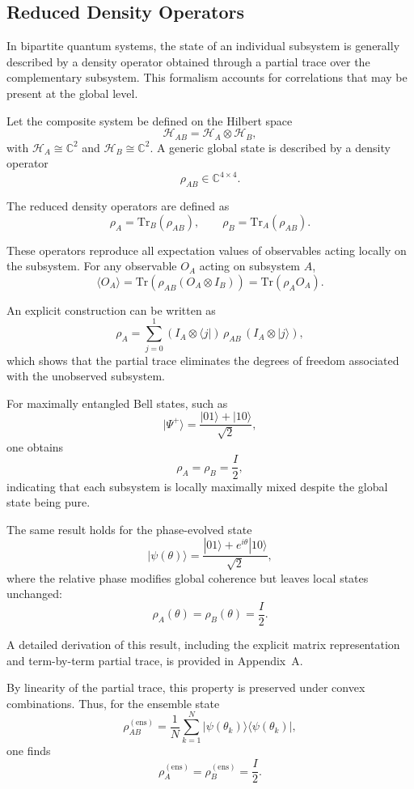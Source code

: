 \documentclass[a4paper]{article}
\begin{document}
\subsection{Reduced Density Operators}

In bipartite quantum systems, the state of an individual subsystem is generally described by a density operator obtained through a partial trace over the complementary subsystem. This formalism accounts for correlations that may be present at the global level.

Let the composite system be defined on the Hilbert space
\[
\mathcal{H}_{AB} = \mathcal{H}_A \otimes \mathcal{H}_B,
\]
with $\mathcal{H}_A \cong \mathbb{C}^2$ and $\mathcal{H}_B \cong \mathbb{C}^2$. A generic global state is described by a density operator
\[
\rho_{AB} \in \mathbb{C}^{4 \times 4}.
\]

The reduced density operators are defined as
\[
\rho_A = \mathrm{Tr}_B(\rho_{AB}), \qquad
\rho_B = \mathrm{Tr}_A(\rho_{AB}).
\]

These operators reproduce all expectation values of observables acting locally on the subsystem. For any observable $O_A$ acting on subsystem $A$,
\[
\langle O_A \rangle = \mathrm{Tr}(\rho_{AB}(O_A \otimes I_B)) = \mathrm{Tr}(\rho_A O_A).
\]

An explicit construction can be written as
\[
\rho_A = \sum_{j=0}^{1} (I_A \otimes \langle j|)\,\rho_{AB}\,(I_A \otimes |j\rangle),
\]
which shows that the partial trace eliminates the degrees of freedom associated with the unobserved subsystem.

For maximally entangled Bell states, such as
\[
|\Psi^+\rangle = \frac{|01\rangle + |10\rangle}{\sqrt{2}},
\]
one obtains
\[
\rho_A = \rho_B = \frac{I}{2},
\]
indicating that each subsystem is locally maximally mixed despite the global state being pure.

The same result holds for the phase-evolved state
\[
|\psi(\theta)\rangle = \frac{|01\rangle + e^{i\theta}|10\rangle}{\sqrt{2}},
\]
where the relative phase modifies global coherence but leaves local states unchanged:
\[
\rho_A(\theta) = \rho_B(\theta) = \frac{I}{2}.
\]

A detailed derivation of this result, including the explicit matrix representation and term-by-term partial trace, is provided in Appendix~A.

By linearity of the partial trace, this property is preserved under convex combinations. Thus, for the ensemble state
\[
\rho_{AB}^{(\mathrm{ens})}
=
\frac{1}{N}
\sum_{k=1}^{N}
|\psi(\theta_k)\rangle\langle\psi(\theta_k)|,
\]
one finds
\[
\rho_A^{(\mathrm{ens})} = \rho_B^{(\mathrm{ens})} = \frac{I}{2}.
\]
\end{document}
